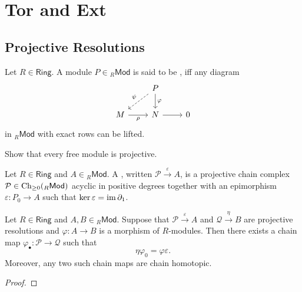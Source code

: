 \section*{Tor and Ext}
\subsection*{Projective Resolutions}

\begin{definition}
	Let $R \in \mathsf{Ring}$. A module $P \in {_R}\mathsf{Mod}$ is said to be , iff any diagram
	\begin{equation*}
		\begin{tikzcd}
			& P \arrow[d,"\varphi"]\arrow[dl,dashed,"\psi"']\\
			M \arrow[r,"\rho"'] & N \arrow[r] & 0
		\end{tikzcd}
	\end{equation*}
	\noindent in $_R\mathsf{Mod}$ with exact rows can be lifted.
\end{definition}

\begin{exercise}
	Show that every free module is projective.
\end{exercise}

\begin{definition}
	Let $R \in \mathsf{Ring}$ and $A \in {_R}\mathsf{Mod}$. A , written $\mathcal{P}\overset{\varepsilon}{\to} A$, is a projective chain complex $\mathcal{P} \in \operatorname{Ch}_{\geq 0}({_R}\mathsf{Mod})$ acyclic in positive degrees together with an epimorphism $\varepsilon : P_0 \to A$ such that $\ker \varepsilon = \operatorname{im} \partial_1$. 
\end{definition}

\begin{theorem}
	\label{thm:comparison_theorem}
	Let $R \in \mathsf{Ring}$ and $A,B \in {_R}\mathsf{Mod}$. Suppose that $\mathcal{P} \overset{\varepsilon}{\to} A$ and $\mathcal{Q} \overset{\eta}{\to} B$ are projective resolutions and $\varphi : A \to B$ is a morphism of $R$-modules. Then there exists a chain map $\varphi_\bullet : \mathcal{P} \to \mathcal{Q}$ such that 
	\begin{equation*}
		\eta\varphi_0 = \varphi\varepsilon.
	\end{equation*}
	Moreover, any two such chain maps are chain homotopic.
\end{theorem}

\begin{proof}
	
\end{proof}
